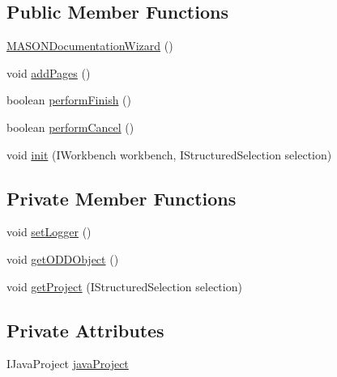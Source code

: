 \subsection*{Public Member Functions}
\begin{DoxyCompactItemize}
\item 
\hyperlink{classit_1_1isislab_1_1masonhelperdocumentation_1_1mason_1_1wizards_1_1_m_a_s_o_n_documentation_wizard_aec5c0c8393e7d9ff811171795f168c2e}{M\-A\-S\-O\-N\-Documentation\-Wizard} ()
\item 
void \hyperlink{classit_1_1isislab_1_1masonhelperdocumentation_1_1mason_1_1wizards_1_1_m_a_s_o_n_documentation_wizard_a3fba04c7869d9d230cd4ef56bf625f4e}{add\-Pages} ()
\item 
boolean \hyperlink{classit_1_1isislab_1_1masonhelperdocumentation_1_1mason_1_1wizards_1_1_m_a_s_o_n_documentation_wizard_a2b46b23ff5726ddf0c32291d74a2ec71}{perform\-Finish} ()
\item 
boolean \hyperlink{classit_1_1isislab_1_1masonhelperdocumentation_1_1mason_1_1wizards_1_1_m_a_s_o_n_documentation_wizard_a294a3b46b0e8a3150b229d1db0b5fb3c}{perform\-Cancel} ()
\item 
void \hyperlink{classit_1_1isislab_1_1masonhelperdocumentation_1_1mason_1_1wizards_1_1_m_a_s_o_n_documentation_wizard_a85c0c396499d69e9180dbaca2dd6c725}{init} (I\-Workbench workbench, I\-Structured\-Selection selection)
\end{DoxyCompactItemize}
\subsection*{Private Member Functions}
\begin{DoxyCompactItemize}
\item 
void \hyperlink{classit_1_1isislab_1_1masonhelperdocumentation_1_1mason_1_1wizards_1_1_m_a_s_o_n_documentation_wizard_af1edd4add23bbf210945e1506c9ce018}{set\-Logger} ()
\item 
void \hyperlink{classit_1_1isislab_1_1masonhelperdocumentation_1_1mason_1_1wizards_1_1_m_a_s_o_n_documentation_wizard_ad3d20b7b712ff48d60a7f321c751a9a5}{get\-O\-D\-D\-Object} ()
\item 
void \hyperlink{classit_1_1isislab_1_1masonhelperdocumentation_1_1mason_1_1wizards_1_1_m_a_s_o_n_documentation_wizard_a70caf610771efa8c826aaf0d8b1dafef}{get\-Project} (I\-Structured\-Selection selection)
\end{DoxyCompactItemize}
\subsection*{Private Attributes}
\begin{DoxyCompactItemize}
\item 
I\-Java\-Project \hyperlink{classit_1_1isislab_1_1masonhelperdocumentation_1_1mason_1_1wizards_1_1_m_a_s_o_n_documentation_wizard_ab4a56d14d946063217ce087d78f06210}{java\-Project}
\end{DoxyCompactItemize}
